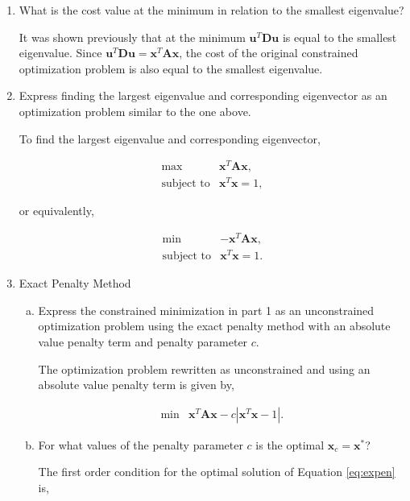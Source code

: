 \documentclass{article}
\begin{document}
\begin{enumerate}
	\item What is the cost value at the minimum in relation to the smallest eigenvalue?
	
	It was shown previously that at the minimum $\mathbf{u}^T\mathbf{D}\mathbf{u}$ is equal to the smallest eigenvalue.
	Since $\mathbf{u}^T\mathbf{D}\mathbf{u} = \mathbf{x}^T\mathbf{A}\mathbf{x}$, the cost of the original constrained optimization problem is also equal to the smallest eigenvalue.
	
	\item Express finding the largest eigenvalue and corresponding eigenvector as an optimization problem similar to the one above.
	
	To find the largest eigenvalue and corresponding eigenvector,
	
	\begin{eqnarray*}
		\max & \mathbf{x}^T\mathbf{A}\mathbf{x}, \\
		\text{subject to} & \mathbf{x}^T\mathbf{x} = 1,
	\end{eqnarray*}
	
	or equivalently,
	
	\begin{eqnarray*}
		\min & -\mathbf{x}^T\mathbf{A}\mathbf{x}, \\
		\text{subject to} & \mathbf{x}^T\mathbf{x} = 1.
	\end{eqnarray*}
	
	\item Exact Penalty Method
	
	\begin{enumerate}[a)]
		\item Express the constrained minimization in part 1 as an unconstrained optimization problem using the exact penalty method with an absolute value penalty term and penalty parameter $c$.
		
		The optimization problem rewritten as unconstrained and using an absolute value penalty term is given by,
		
		\begin{eqnarray}
		\label{eq:expen}
			\min & \mathbf{x}^T\mathbf{A}\mathbf{x} - c|\mathbf{x}^T\mathbf{x} - 1|. 
		\end{eqnarray}
		
		\item For what values of the penalty parameter $c$ is the optimal $\mathbf{x}_c = \mathbf{x}^*$?
		
		The first order condition for the optimal solution of Equation \ref{eq:expen} is,
		

\end{enumerate}
\end{enumerate}
\end{document}

